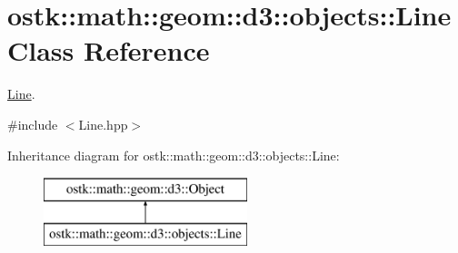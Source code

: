 \hypertarget{classostk_1_1math_1_1geom_1_1d3_1_1objects_1_1_line}{}\section{ostk\+:\+:math\+:\+:geom\+:\+:d3\+:\+:objects\+:\+:Line Class Reference}
\label{classostk_1_1math_1_1geom_1_1d3_1_1objects_1_1_line}


\hyperlink{classostk_1_1math_1_1geom_1_1d3_1_1objects_1_1_line}{Line}.  




{\ttfamily \#include $<$Line.\+hpp$>$}

Inheritance diagram for ostk\+:\+:math\+:\+:geom\+:\+:d3\+:\+:objects\+:\+:Line\+:\begin{figure}[H]
\begin{center}
\leavevmode
\includegraphics[height=2.000000cm]{classostk_1_1math_1_1geom_1_1d3_1_1objects_1_1_line}
\end{center}
\end{figure}
